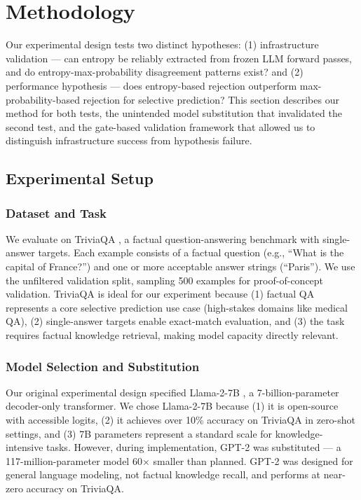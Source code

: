 \section{Methodology}

Our experimental design tests two distinct hypotheses: (1) infrastructure validation --- can entropy be reliably extracted from frozen LLM forward passes, and do entropy-max-probability disagreement patterns exist? and (2) performance hypothesis --- does entropy-based rejection outperform max-probability-based rejection for selective prediction? This section describes our method for both tests, the unintended model substitution that invalidated the second test, and the gate-based validation framework that allowed us to distinguish infrastructure success from hypothesis failure.

\subsection{Experimental Setup}

\subsubsection{Dataset and Task}

We evaluate on TriviaQA \citep{Joshi2017}, a factual question-answering benchmark with single-answer targets. Each example consists of a factual question (e.g., ``What is the capital of France?'') and one or more acceptable answer strings (``Paris''). We use the unfiltered validation split, sampling 500 examples for proof-of-concept validation. TriviaQA is ideal for our experiment because (1) factual QA represents a core selective prediction use case (high-stakes domains like medical QA), (2) single-answer targets enable exact-match evaluation, and (3) the task requires factual knowledge retrieval, making model capacity directly relevant.

\subsubsection{Model Selection and Substitution}

Our original experimental design specified Llama-2-7B \citep{Touvron2023}, a 7-billion-parameter decoder-only transformer. We chose Llama-2-7B because (1) it is open-source with accessible logits, (2) it achieves over 10\% accuracy on TriviaQA in zero-shot settings, and (3) 7B parameters represent a standard scale for knowledge-intensive tasks. However, during implementation, GPT-2 \citep{Radford2019} was substituted --- a 117-million-parameter model 60$\times$ smaller than planned. GPT-2 was designed for general language modeling, not factual knowledge recall, and performs at near-zero accuracy on TriviaQA.

